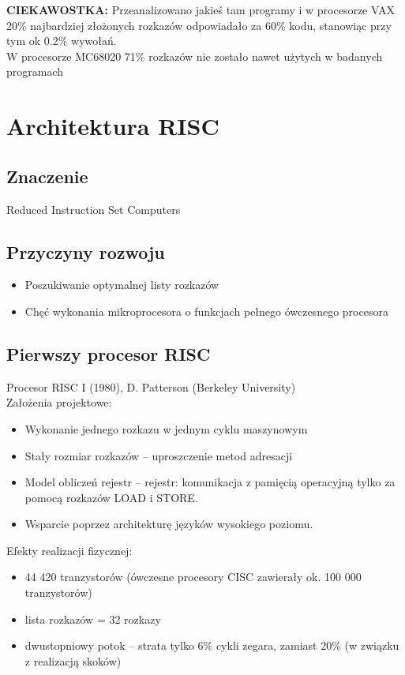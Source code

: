 \documentclass[a4paper,twoside]{article}
\begin{document}
   \textbf{\large CIEKAWOSTKA:} Przeanalizowano jakieś tam programy i w procesorze VAX 20\% najbardziej złożonych rozkazów odpowiadało za 60\% kodu, stanowiąc przy tym ok 0.2\% wywołań.\\ W procesorze MC68020 71\% rozkazów nie zostało nawet użytych w badanych programach
   
	\section*{Architektura RISC}
		\subsection*{Znaczenie} \noindent
		Reduced Instruction Set Computers
   		\subsection*{Przyczyny rozwoju}
   		\begin{itemize}
   			\item Poszukiwanie optymalnej listy rozkazów
   			\item Chęć wykonania mikroprocesora o funkcjach pełnego ówczesnego procesora
   		\end{itemize}
   		
   		\subsection*{Pierwszy procesor RISC} \noindent
   		Procesor RISC I (1980), D. Patterson (Berkeley University)\\
   		Założenia projektowe:
   		\begin{itemize}
   			\item Wykonanie jednego rozkazu w jednym cyklu maszynowym
   			\item Stały rozmiar rozkazów – uproszczenie metod adresacji
   			\item Model obliczeń rejestr – rejestr: komunikacja z pamięcią operacyjną tylko za pomocą rozkazów LOAD i STORE.
   			\item Wsparcie poprzez architekturę języków wysokiego poziomu.
   		\end{itemize}
   		Efekty realizacji fizycznej:
   		\begin{itemize}
   			\item 44 420 tranzystorów (ówczesne procesory CISC zawierały ok. 100 000 tranzystorów)
   			\item lista rozkazów = 32 rozkazy
   			\item dwustopniowy potok – strata tylko 6\% cykli zegara, zamiast 20\% (w związku z realizacją skoków)
   		\end{itemize}
   		
\end{document}
